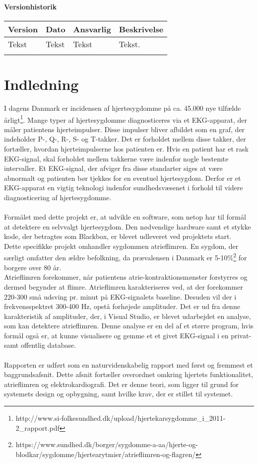 \subsubsection{Versionhistorik}

\begin{longtabu} to 
    Version &    Dato &    Ansvarlig &    Beskrivelse\\[-1ex]
    \midrule
    Tekst &    Tekst &    Tekst &    Tekst.\\
\label{version_Systemark}
\end{longtabu}

\chapter{Indledning}
I dagens Danmark er incidensen af hjertesygdomme på ca. 45.000 nye tilfælde årligt\footnote{http://www.si-folkesundhed.dk/upload/hjertekarsygdomme\_i\_2011-2\_rapport.pdf}. Mange typer af hjertesygdomme diagnosticeres via et EKG-apparat, der måler patientens hjerteimpulser. Disse impulser bliver afbildet som en graf, der indeholder P-, Q-, R-, S- og T-takker. Det er forholdet mellem disse takker, der fortæller, hvordan hjerteimpulserne hos patienten er. Hvis en patient har et rask EKG-signal, skal forholdet mellem takkerne være indenfor nogle bestemte intervaller. Et EKG-signal, der afviger fra disse standarter siges at være abnormalt og patienten bør tjekkes for en eventuel hjertesygdom. Derfor er et EKG-apparat en vigtig teknologi indenfor sundhedsvæsenet i forhold til videre diagnosticering af hjertesygdomme.\\ \\
Formålet med dette projekt er, at udvikle en software, som netop har til formål at detektere en selvvalgt hjertesygdom. Den nødvendige hardware samt et stykke kode, der betragtes som Blackbox, er blevet udleveret ved projektets start.\\
Dette specifikke projekt omhandler sygdommen atrieflimren. En sygdom, der særligt omfatter den ældre befolkning, da prævalensen i Danmark er 5-10\%\footnote{https://www.sundhed.dk/borger/sygdomme-a-aa/hjerte-og-blodkar/sygdomme/hjertearytmier/atrieflimren-og-flagren/} for borgere over 80 år.\\
Atrieflimren forekommer, når patientens atrie-kontraktionsmønster forstyrres og dermed begynder at flimre. Atrieflimren karakteriseres ved, at der forekommer 220-300 små udsving pr. minut på EKG-signalets baseline. Desuden vil der i frekvensspektret 300-400 Hz, opstå forhøjede amplituder. Det er ud fra denne karakteristik af amplituder, der, i Visual Studio, er blevet udarbejdet en analyse, som kan detektere atrieflimren. Denne analyse er en del af et større program, hvis formål også er, at kunne visualisere og gemme et et givet EKG-signal i en privat- samt offentlig database. \\ \\
Rapporten er udført som en naturvidenskabelig rapport med først og fremmest et baggrundsafsnit. Dette afsnit fortæller overordnet omkring hjertets funktionalitet, atrieflimren og elektrokardiografi. Det er denne teori, som ligger til grund for systemets design og opbygning, samt hvilke krav, der er stillet til systemet.
  
